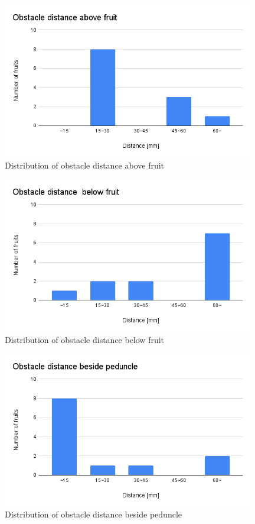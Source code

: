 \vspace{5mm}
\begin{figure}[H]
  \centering
  \includegraphics[width=110mm]{images/png/resultabovef.png}
  \caption{Distribution of obstacle distance above fruit}
  \label{Fig:resultabovef}
\end{figure}

\vspace{5mm}
\begin{figure}[H]
  \centering
  \includegraphics[width=110mm]{images/png/resultbelowf.png}
  \caption{Distribution of obstacle distance below fruit}
  \label{Fig:resultbelowf}
\end{figure}

\vspace{5mm}
\begin{figure}[H]
  \centering
  \includegraphics[width=110mm]{images/png/resultbesidep.png}
  \caption{Distribution of obstacle distance beside peduncle}
  \label{Fig:resultbesidep}
\end{figure}


%